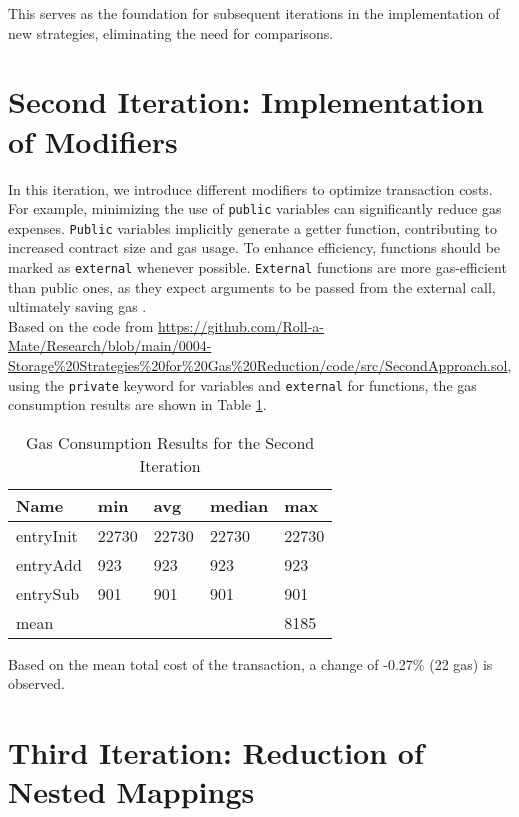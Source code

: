 \documentclass[fleqn,10pt]{olplainarticle}
\begin{document}
This serves as the foundation for subsequent iterations in the implementation of new strategies, eliminating the need for comparisons.

\section{Second Iteration: Implementation of Modifiers}

In this iteration, we introduce different modifiers to optimize transaction costs. For example, minimizing the use of \texttt{public} variables can significantly reduce gas expenses. \texttt{Public} variables implicitly generate a getter function, contributing to increased contract size and gas usage. To enhance efficiency, functions should be marked as \texttt{external} whenever possible. \texttt{External} functions are more gas-efficient than public ones, as they expect arguments to be passed from the external call, ultimately saving gas \cite{malanii_solidity_2023}. \\
Based on the code from \url{https://github.com/Roll-a-Mate/Research/blob/main/0004-Storage%20Strategies%20for%20Gas%20Reduction/code/src/SecondApproach.sol}, using the \texttt{private} keyword for variables and \texttt{external} for functions, the gas consumption results are shown in Table \ref{tab:SecondIT}.

\begin{table}[H]
	\centering
	\begin{tabular}{|l|l|l|l|l|}
		\hline
		Name       & min    & avg   & median &  max   \\ \hline
		entryInit  & 22730  & 22730 & 22730  &  22730 \\ \hline
		entryAdd   & 923  	& 923 	& 923  	 &  923   \\ \hline
		entrySub   & 901  	& 901 	& 901    &  901   \\ \hline
		mean       &\cellcolor{black}&\cellcolor{black}&\cellcolor{black}&8185\\ \hline
	\end{tabular}
	\caption{Gas Consumption Results for the Second Iteration}
	\label{tab:SecondIT}
\end{table}

Based on the mean total cost of the transaction, a change of -0.27\% (22 gas) is observed.

\section{Third Iteration: Reduction of Nested Mappings}
\end{document}
